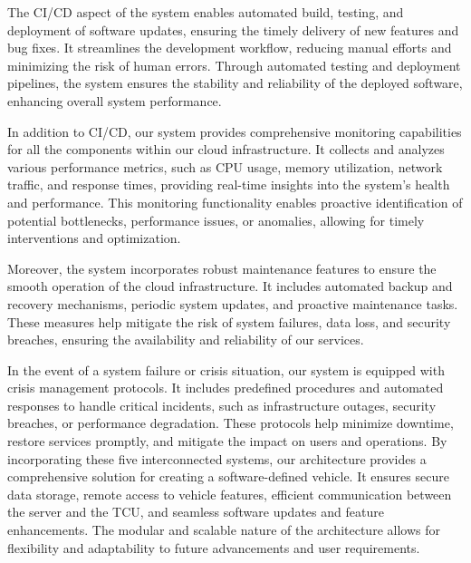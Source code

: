 \documentclass[
12pt,
oneside, 
onehalfspacing, 
nolistspacing, 
parskip, 
chapterinoneline, 
]{AASTCOMPUTER}
\begin{document}
The CI/CD aspect of the system enables automated build, testing, and deployment of software updates, ensuring the timely delivery of new features and bug fixes. It streamlines the development workflow, reducing manual efforts and minimizing the risk of human errors. Through automated testing and deployment pipelines, the system ensures the stability and reliability of the deployed software, enhancing overall system performance.

In addition to CI/CD, our system provides comprehensive monitoring capabilities for all the components within our cloud infrastructure. It collects and analyzes various performance metrics, such as CPU usage, memory utilization, network traffic, and response times, providing real-time insights into the system's health and performance. This monitoring functionality enables proactive identification of potential bottlenecks, performance issues, or anomalies, allowing for timely interventions and optimization.

Moreover, the system incorporates robust maintenance features to ensure the smooth operation of the cloud infrastructure. It includes automated backup and recovery mechanisms, periodic system updates, and proactive maintenance tasks. These measures help mitigate the risk of system failures, data loss, and security breaches, ensuring the availability and reliability of our services.

In the event of a system failure or crisis situation, our system is equipped with crisis management protocols. It includes predefined procedures and automated responses to handle critical incidents, such as infrastructure outages, security breaches, or performance degradation. These protocols help minimize downtime, restore services promptly, and mitigate the impact on users and operations.
By incorporating these five interconnected systems, our architecture provides a comprehensive solution for creating a software-defined vehicle. It ensures secure data storage, remote access to vehicle features, efficient communication between the server and the TCU, and seamless software updates and feature enhancements. The modular and scalable nature of the architecture allows for flexibility and adaptability to future advancements and user requirements.
\newpage
\end{document}

